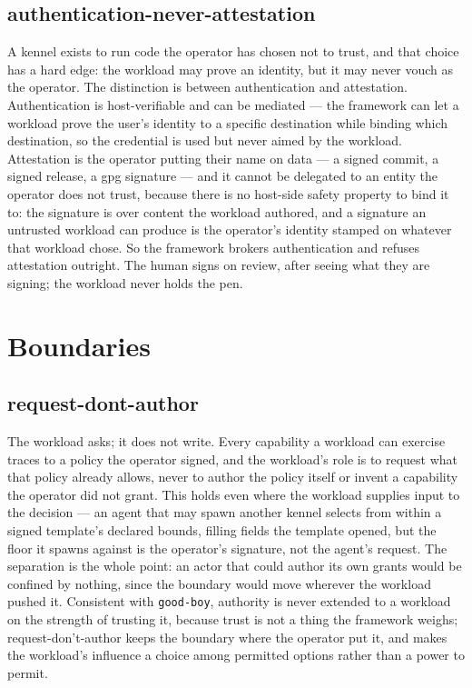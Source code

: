 \hypertarget{authentication-never-attestation}{%
\subsection{\texorpdfstring{authentication-never-attestation}{authentication-never-attestation}}\label{authentication-never-attestation}}

A kennel exists to run code the operator has chosen not to trust, and
that choice has a hard edge: the workload may prove an identity, but it
may never vouch as the operator. The distinction is between
authentication and attestation. Authentication is host-verifiable and
can be mediated --- the framework can let a workload prove the user's
identity to a specific destination while binding which destination, so
the credential is used but never aimed by the workload. Attestation is
the operator putting their name on data --- a signed commit, a signed
release, a gpg signature --- and it cannot be delegated to an entity the
operator does not trust, because there is no host-side safety property
to bind it to: the signature is over content the workload authored, and
a signature an untrusted workload can produce is the operator's identity
stamped on whatever that workload chose. So the framework brokers
authentication and refuses attestation outright. The human signs on
review, after seeing what they are signing; the workload never holds the
pen.

\hypertarget{boundaries}{%
\section{Boundaries}\label{boundaries}}

\hypertarget{request-dont-author}{%
\subsection{\texorpdfstring{request-dont-author}{request-dont-author}}\label{request-dont-author}}

The workload asks; it does not write. Every capability a workload can
exercise traces to a policy the operator signed, and the workload's role
is to request what that policy already allows, never to author the
policy itself or invent a capability the operator did not grant. This
holds even where the workload supplies input to the decision --- an
agent that may spawn another kennel selects from within a signed
template's declared bounds, filling fields the template opened, but the
floor it spawns against is the operator's signature, not the agent's
request. The separation is the whole point: an actor that could author
its own grants would be confined by nothing, since the boundary would
move wherever the workload pushed it. Consistent with \texttt{good-boy},
authority is never extended to a workload on the strength of trusting
it, because trust is not a thing the framework weighs;
request-don't-author keeps the boundary where the operator put it, and
makes the workload's influence a choice among permitted options rather
than a power to permit.

